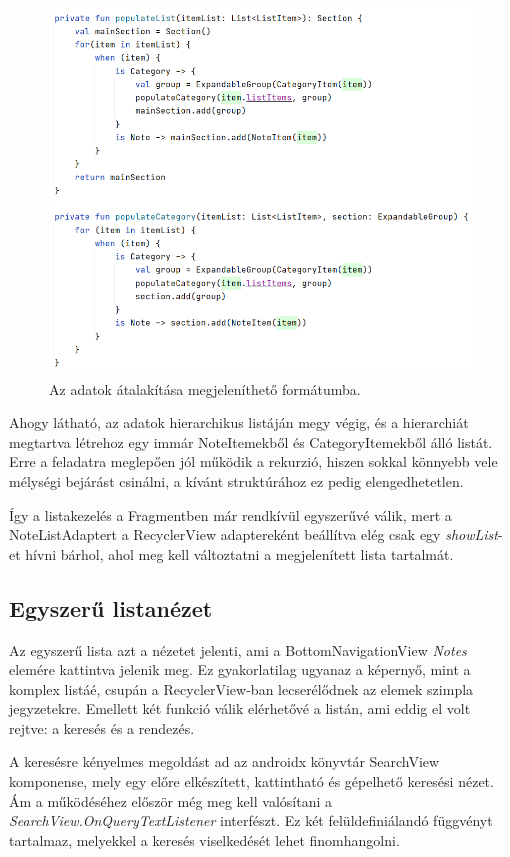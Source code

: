 \begin{figure}[!ht]
	\centering
	\includegraphics[width=145mm, keepaspectratio]{figures/list_population.png}
	\caption{Az adatok átalakítása megjeleníthető formátumba.}
	\label{fig:PopulateList}
\end{figure}

Ahogy látható, az adatok hierarchikus listáján megy végig, és a hierarchiát megtartva létrehoz egy immár NoteItemekből és CategoryItemekből álló listát. Erre a feladatra meglepően jól működik a rekurzió, hiszen sokkal könnyebb vele mélységi bejárást csinálni, a kívánt struktúrához ez pedig elengedhetetlen. 

Így a listakezelés a Fragmentben már rendkívül egyszerűvé válik, mert a NoteListAdaptert a RecyclerView adaptereként beállítva elég csak egy \emph{showList}-et hívni bárhol, ahol meg kell változtatni a megjelenített lista tartalmát. 

\subsection{Egyszerű listanézet}
Az egyszerű lista azt a nézetet jelenti, ami a BottomNavigationView \emph{Notes} elemére kattintva jelenik meg. Ez gyakorlatilag ugyanaz a képernyő, mint a komplex listáé, csupán a RecyclerView-ban lecserélődnek az elemek szimpla jegyzetekre. Emellett két funkció válik elérhetővé a listán, ami eddig el volt rejtve: a keresés és a rendezés. 

A keresésre kényelmes megoldást ad az androidx könyvtár SearchView komponense, mely egy előre elkészített, kattintható és gépelhető keresési nézet. Ám a működéséhez először még meg kell valósítani a \emph{SearchView.OnQueryTextListener} interfészt. Ez két felüldefiniálandó függvényt tartalmaz, melyekkel a keresés viselkedését lehet finomhangolni. 

